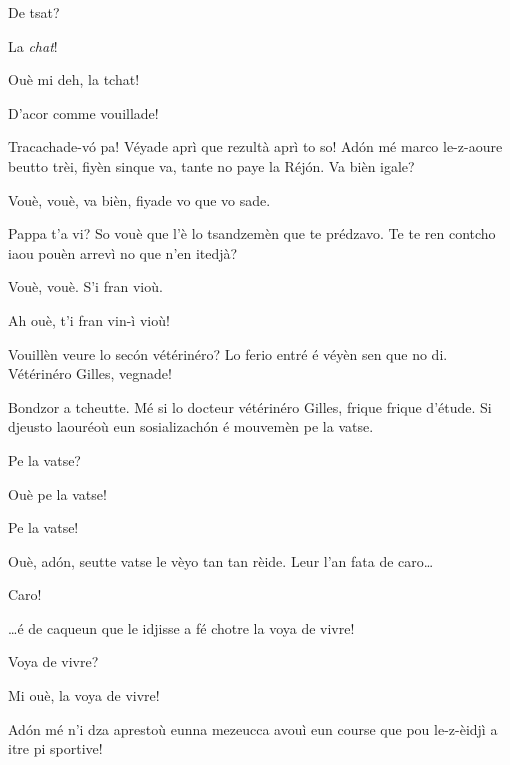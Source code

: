 \begin{drama}
\Cienspeaks De tsat?

\Schulzspeaks La \textit{chat}!

\Mariettospeaks{} Ouè mi deh, la tchat!

\Cienspeaks{} D'acor comme vouillade!

\Schulzspeaks Tracachade-v\'o pa! Véyade aprì que rezultà aprì to so! Ad\'on mé marco le-z-aoure beutto trèi, fiyèn sinque va, tante no paye la Réjón. Va bièn igale?

\Cienspeaks Vouè, vouè, va bièn, fiyade vo que vo sade.



\Simonspeaks Pappa t’a vi? So vouè que l’è lo tsandzemèn que te pré\-dza\-vo. Te te ren contcho iaou pouèn arrevì no que n’en itedjà?

\Cienspeaks Vouè, vouè. S’i fran vioù.

\Mariettospeaks Ah ouè, t'i fran vin-ì vioù!


\Chefspeaks Vouillèn veure lo sec\'on vétérinéro? Lo ferio entré é véyèn sen que no di. Vétérinéro Gilles, vegnade!


\Maracanaspeaks Bondzor a tcheutte. Mé si lo docteur vétérinéro Gilles, fri\-que frique d’étude. Si djeusto laouréoù eun sosializach\'on é mouvemèn pe la vatse.

\Cienspeaks Pe la vatse?

\Maracanaspeaks Ouè pe la vatse!

\Mariettospeaks Pe la vatse!

\Maracanaspeaks Ouè, ad\'on, seutte vatse le vèyo tan tan rèide. Leur l’an fata de caro\ldots

\Mariettospeaks Caro!

\Maracanaspeaks \ldots é de caqueun que le idjisse a fé chotre la voya de vivre!

\Cienspeaks Voya de vivre?

\Mariettospeaks{} Mi ouè, la voya de vivre!

\Maracanaspeaks  Ad\'on mé n’i dza aprestoù eunna mezeucca avouì eun cour\-se que pou le-z-èidjì a itre pi sportive!


\end{drama}
